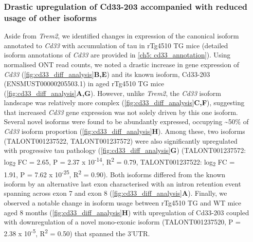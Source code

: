 \subsubsection{Drastic upregulation of Cd33-203 accompanied with reduced usage of other isoforms}
Aside from \textit{Trem2}, we identified changes in expression of the canonical isoform annotated to \textit{Cd33} with accumulation of tau in rTg4510 TG mice (detailed isoform annotations of \textit{Cd33} are provided in \cref{ch5: cd33_annotation}). Using normalised ONT read counts, we noted a drastic increase in gene expression of \textit{Cd33} (\cref{fig:cd33_diff_analysis}\textbf{B,E}) and its known isoform, Cd33-203 (ENSMUST00000205503.1) in aged rTg4510 TG mice (\cref{fig:cd33_diff_analysis}\textbf{A,G}). However, unlike \textit{Trem2}, the \textit{Cd33} isoform landscape was relatively more complex (\cref{fig:cd33_diff_analysis}\textbf{C,F}), suggesting that increased \textit{Cd33} gene expression was not solely driven by this one isoform. Several novel isoforms were found to be abundantly expressed, occupying \textasciitilde50\% of \textit{Cd33} isoform proportion (\cref{fig:cd33_diff_analysis}\textbf{H}). Among these, two isoforms (TALONT001237522, TALONT001237572) were also significantly upregulated with progressive tau pathology (\cref{fig:cd33_diff_analysis}\textbf{G}) (TALONT001237572: log\textsubscript{2} FC = 2.65, P = 2.37 x 10\textsuperscript{-14}, R\textsuperscript{2} = 0.79, TALONT001237522: log\textsubscript{2} FC = 1.91, P = 7.62 x 10\textsuperscript{-25}, R\textsuperscript{2} = 0.90). Both isoforms differed from the known isoform by an alternative last exon characterised with an intron retention event spanning across exon 7 and exon 8 (\cref{fig:cd33_diff_analysis}\textbf{A}). Finally, we observed a notable change in isoform usage between rTg4510 TG and WT mice aged 8 months (\cref{fig:cd33_diff_analysis}\textbf{H}) with upregulation of Cd33-203 coupled with downregulation of a novel mono-exonic isoform (TALONT001237520, P = 2.38 x 10\textsuperscript{-5}, R\textsuperscript{2} = 0.50) that spanned the 3'UTR. 

  

